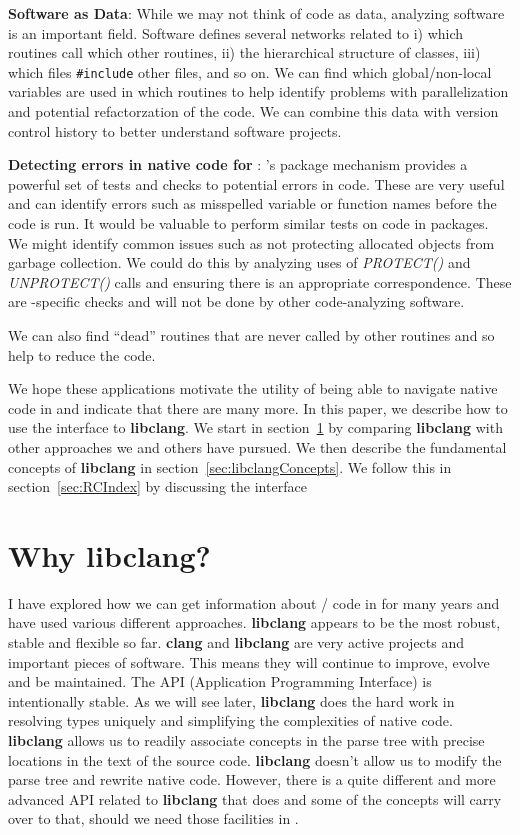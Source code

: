 \documentclass[article]{jss}
\def\C{\proglang{C}}
\def\Cpp{\proglang{C$++$}}
\def\R{\proglang{R}}
\def\Cfunc#1{\textit{#1()}}
\def\libclang{\textbf{libclang}}
\def\clang{\textbf{clang}}
\begin{document}
\textbf{Software as Data}: While we may not think of code as data,
analyzing software is an important field.  Software defines several
networks related to i) which routines call which other routines, ii)
the hierarchical structure of \Cpp{} classes, iii) which files
\texttt{\#include} other files, and so on.  We can find which
global/non-local variables are used in which routines to help identify
problems with parallelization and potential refactorzation of the
code.  We can combine this data with version control history to better
understand software projects.


\textbf{Detecting errors in native code for \R}: \R's package
mechanism provides a powerful set of tests and checks to potential
errors in \R{} code.  These are very useful and can identify errors
such as misspelled variable or function names before the code is run.
It would be valuable to perform similar tests on \C{} code in \R{}
packages.  We might identify common issues such as not protecting
allocated \R{} objects from garbage collection.  We could do this by
analyzing uses of \Cfunc{PROTECT} and \Cfunc{UNPROTECT} calls and
ensuring there is an appropriate correspondence.  These are
\R-specific checks and will not be done by other code-analyzing
software.


We can also find ``dead'' routines that are never called by other
routines and so help to reduce the code.

We hope these applications motivate the utility of being able to
navigate native code in \R and indicate that there are many more.  In
this paper, we describe how to use the \R{} interface to \libclang.
We start in section~\ref{sec:Whylibclang} by comparing \libclang{}
with other approaches we and others have pursued.  We then describe
the fundamental concepts of \libclang{} in
section~\ref{sec:libclangConcepts}.  We follow this in
section~\ref{sec:RCIndex} by discussing the \R{} interface


\section[Why libclang?]{Why \libclang?}\label{sec:Whylibclang}

I have explored how we can get information about \C/\Cpp{} code in
\R{} for many years and have used various different approaches.
\libclang{} appears to be the most robust, stable and flexible so far.
\clang{} and \libclang{} are very active projects and important pieces
of software. This means they will continue to improve, evolve and be
maintained.  The API (Application Programming Interface) is
intentionally stable.  As we will see later, \libclang{} does the hard
work in resolving types uniquely and simplifying the complexities of
native code.  \libclang{} allows us to readily associate concepts in
the parse tree with precise locations in the text of the source
code. \libclang{} doesn't allow us to modify the parse tree and
rewrite native code. However, there is a quite different and more
advanced API related to \libclang{} that does and some of the concepts
will carry over to that, should we need those facilities in \R.
\end{document}
